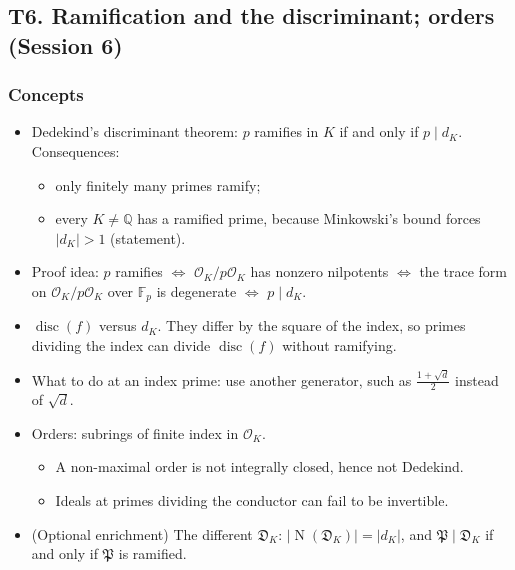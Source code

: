 \documentclass[11pt]{article}
\newcommand{\Q}{\mathbb{Q}}
\newcommand{\F}{\mathbb{F}}
\newcommand{\OK}{\mathcal{O}_K}
\newcommand{\fP}{\mathfrak{P}}
\DeclareMathOperator{\Nm}{N}
\DeclareMathOperator{\disc}{disc}
\begin{document}
\subsection{T6. Ramification and the discriminant; orders (Session 6)}

\subsubsection*{Concepts}
\begin{itemize}
  \item Dedekind's discriminant theorem: $p$ ramifies in $K$ if and only if $p\mid d_K$. Consequences:
  \begin{itemize}
    \item only finitely many primes ramify;
    \item every $K\ne\Q$ has a ramified prime, because Minkowski's bound forces $|d_K|>1$ (statement).
  \end{itemize}
  \item Proof idea: $p$ ramifies $\iff$ $\OK/p\OK$ has nonzero nilpotents $\iff$ the trace form on $\OK/p\OK$ over $\F_p$ is degenerate $\iff$ $p\mid d_K$.
  \item $\disc(f)$ versus $d_K$. They differ by the square of the index, so primes dividing the index can divide $\disc(f)$ without ramifying.
  \item What to do at an index prime: use another generator, such as $\tfrac{1+\sqrt d}{2}$ instead of $\sqrt d$.
  \item Orders: subrings of finite index in $\OK$.
  \begin{itemize}
    \item A non-maximal order is not integrally closed, hence not Dedekind.
    \item Ideals at primes dividing the conductor can fail to be invertible.
  \end{itemize}
  \item (Optional enrichment) The different $\mathfrak D_K$: $|\Nm(\mathfrak D_K)|=|d_K|$, and $\fP\mid\mathfrak D_K$ if and only if $\fP$ is ramified.
\end{itemize}
\end{document}
